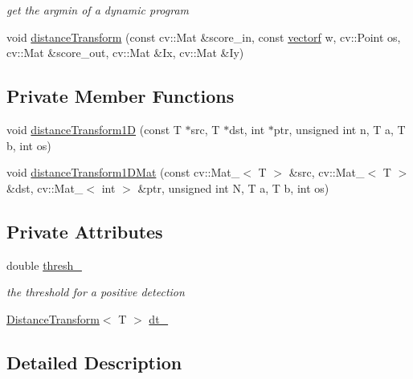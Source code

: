 \begin{DoxyCompactItemize}
\begin{DoxyCompactList}\small\item\em get the argmin of a dynamic program \end{DoxyCompactList}\item 
void \hyperlink{classDynamicProgram_a9de6aa6cd756dee7e9c060b354c59f73}{distance\-Transform} (const cv\-::\-Mat \&score\-\_\-in, const \hyperlink{types_8hpp_a4da5db3ee9e284f719ef5764dbadffc8}{vectorf} w, cv\-::\-Point os, cv\-::\-Mat \&score\-\_\-out, cv\-::\-Mat \&\-Ix, cv\-::\-Mat \&\-Iy)
\end{DoxyCompactItemize}
\subsection*{\-Private \-Member \-Functions}
\begin{DoxyCompactItemize}
\item 
void \hyperlink{classDynamicProgram_a817c1423f8b0ca6241a400bdbc4ec575}{distance\-Transform1\-D} (const \-T $\ast$src, \-T $\ast$dst, int $\ast$ptr, unsigned int n, \-T a, \-T b, int os)
\item 
void \hyperlink{classDynamicProgram_aa8d6acb9b187ef74712b4d5993507fbc}{distance\-Transform1\-D\-Mat} (const cv\-::\-Mat\-\_\-$<$ \-T $>$ \&src, cv\-::\-Mat\-\_\-$<$ \-T $>$ \&dst, cv\-::\-Mat\-\_\-$<$ int $>$ \&ptr, unsigned int \-N, \-T a, \-T b, int os)
\end{DoxyCompactItemize}
\subsection*{\-Private \-Attributes}
\begin{DoxyCompactItemize}
\item 
double \hyperlink{classDynamicProgram_a08f2d4801faa0f964e217b9ac9927ec6}{thresh\-\_\-}
\begin{DoxyCompactList}\small\item\em the threshold for a positive detection \end{DoxyCompactList}\item 
\hyperlink{classDistanceTransform}{\-Distance\-Transform}$<$ \-T $>$ \hyperlink{classDynamicProgram_a6cea0b8559d6a03d81e2003991ab67cf}{dt\-\_\-}
\end{DoxyCompactItemize}


\subsection{\-Detailed \-Description}
